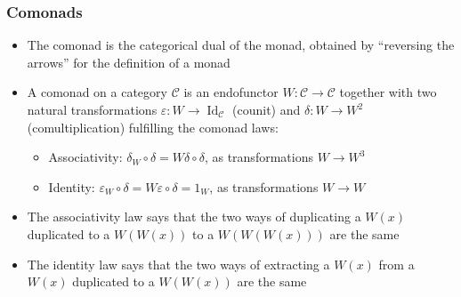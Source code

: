 \documentclass[mathserif,handout]{beamer}
\newcommand{\eps}{\varepsilon}
\begin{document}
\begin{frame}[fragile]
  \frametitle{Comonads}
  \begin{itemize}
    \item The comonad is the categorical dual of the monad, obtained by ``reversing the arrows'' for the definition of a monad
  \item A \alert{comonad} on a category $\mathcal{C}$ is an endofunctor $W: \mathcal{C}\longrightarrow\mathcal{C}$ together with two natural transformations $\eps: W \longrightarrow \operatorname{Id}_\mathcal{C}$ (\alert{counit}) and $\delta: W\longrightarrow W^2$ (\alert{comultiplication}) fulfilling the \alert{comonad laws}:
    \begin{itemize}
    \item \alert{Associativity}: $\delta_W \circ \delta = W\delta \circ \delta$, as transformations $W\longrightarrow W^3$
      \item \alert{Identity}: $\eps_W \circ \delta = W\eps \circ \delta = 1_W$, as transformations $W\longrightarrow W$
    \end{itemize}
  \item The associativity law says that the two ways of \alert{duplicating} a $W(x)$ duplicated to a $W(W(x))$ to a $W(W(W(x)))$ are the same
  \item The identity law says that the two ways of \alert{extracting} a $W(x)$ from a $W(x)$ duplicated to a $W(W(x))$ are the same
  \end{itemize}
\end{frame}
\end{document}
